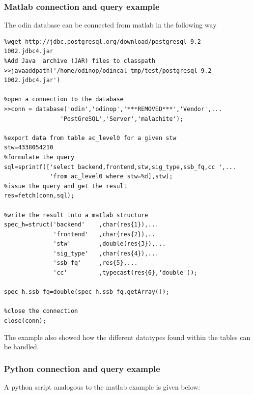 \documentclass[12pt]{article}
\begin{document}
\subsubsection{Matlab connection and query example}
\label{sec:matlab}
The odin database can be connected from matlab in the
following way    
\begin{verbatim}
%wget http://jdbc.postgresql.org/download/postgresql-9.2-1002.jdbc4.jar
%Add Java  archive (JAR) files to classpath
>>javaaddpath('/home/odinop/odincal_tmp/test/postgresql-9.2-1002.jdbc4.jar')

%open a connection to the database
>>conn = database('odin','odinop','***REMOVED***','Vendor',...
                'PostGreSQL','Server','malachite'); 

%export data from table ac_level0 for a given stw
stw=4338054210
%formulate the query
sql=sprintf(['select backend,frontend,stw,sig_type,ssb_fq,cc ',...
             'from ac_level0 where stw=%d],stw);
%issue the query and get the result
res=fetch(conn,sql);

%write the result into a matlab structure
spec_h=struct('backend'    ,char(res{1}),...
              'frontend'   ,char(res{2}),.. 
              'stw'        ,double(res{3}),...
              'sig_type'   ,char(res{4}),...
              'ssb_fq'     ,res{5},...
              'cc'         ,typecast(res{6},'double'));

spec_h.ssb_fq=double(spec_h.ssb_fq.getArray());

%close the connection
close(conn);
\end{verbatim}
The example also showed how the different datatypes
found within the tables can be handled.
\clearpage
\newpage
\subsubsection{Python connection and query example}
\label{sec:python}
A python script analogous to the matlab example is given below: 
\end{document}
